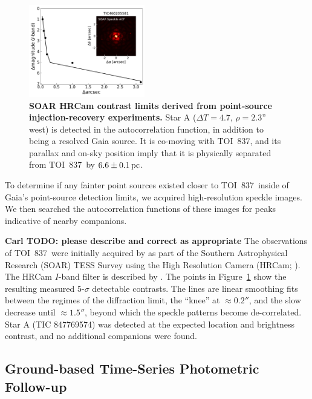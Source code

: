 \documentclass[12pt,twocolumn,tighten]{aastex63}
\newcommand{\tn}{TOI~837} %
\begin{document}
\begin{figure}[!t]
	\begin{center}
		\leavevmode
		\includegraphics[width=0.45\textwidth]{f6.pdf}
	\end{center}
	\vspace{-0.7cm}
	\caption{ 
    {\bf SOAR HRCam contrast limits derived from point-source
    injection-recovery experiments.} Star A ($\Delta T=4.7$,
    $\rho=2.3$'' west) is detected in the autocorrelation function, in
    addition to being a resolved Gaia source.  It is co-moving with
    \tn, and its parallax and on-sky position imply that it is
    physically separated from \tn\ by $6.6\pm 0.1\,{\rm pc}$.
		\label{fig:soar}
	}
\end{figure}

To determine if any fainter point sources existed closer to \tn\
inside of Gaia's point-source detection limits, we acquired
high-resolution speckle images. We then searched the autocorrelation
functions of these images for peaks indicative of nearby companions.

{\bf Carl TODO: please describe and correct as appropriate}
The observations of \tn\ were initially acquired by
\citet{ziegler_soar_2020} as part of the Southern Astrophysical
Research (SOAR) TESS Survey using the High Resolution Camera (HRCam;
\citealt{tokovinin_ten_2018}).  The HRCam $I$-band filter is described
by \citet{tokovinin_ten_2018}.  The points in Figure~\ref{fig:soar}
show the resulting measured 5-$\sigma$ detectable contrasts.  The
lines are linear smoothing fits between the regimes of the diffraction
limit, the ``knee'' at $\approx 0.2''$, and the slow decrease until
$\approx 1.5''$, beyond which the speckle patterns become
de-correlated.  Star A (TIC 847769574) was detected at the expected
location and brightness contrast, and no additional companions were
found.



\subsection{Ground-based Time-Series Photometric Follow-up}
\label{subsec:groundphot}
\end{document}
